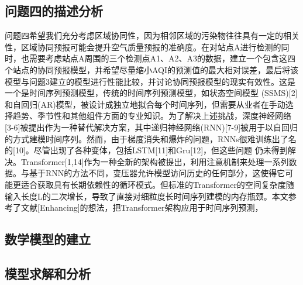 \documentclass[a4paper,10pt]{my_paper}
\numberwithin{equation}{section}
\begin{document}
\subsection{问题四的描述分析}
问题四希望我们充分考虑区域协同性，因为相邻区域的污染物往往具有一定的相关性，区域协同预报可能会提升空气质量预报的准确度。在对站点A进行检测的同时，也需要考虑站点A周围的三个检测点A1、A2、A3的数据，建立一个包含这四个站点的协同预报模型，并希望尽量缩小AQI的预测值的最大相对误差，最后将该模型与问题3建立的模型进行性能比较，并讨论协同预报模型的现实有效性。这是一个是时间序列预测模型，传统的时间序列预测模型，如状态空间模型 (SSMS)[2]和自回归(AR)模型，被设计成独立地拟合每个时间序列，但需要从业者在手动选择趋势、季节性和其他组件方面的专业知识。为了解决上述挑战，深度神经网络[3-6]被提出作为一种替代解决方案，其中递归神经网络(RNN)[7-9]被用于以自回归的方式建模时间序列。然而，由于梯度消失和爆炸的问题，RNNs很难训练出了名的[10]。尽管出现了各种变体，包括LSTM[11]和Gru[12]，但这些问题 仍未得到解决。Transformer[1,14]作为一种全新的架构被提出，利用注意机制来处理一系列数据。与基于RNN的方法不同，变压器允许模型访问历史的任何部分，这使得它可能更适合获取具有长期依赖性的循环模式。但标准的Transformer的空间复杂度随输入长度L的二次增长，导致了直接对细粒度长时间序列建模的内存瓶颈。本文参考了文献{\color{red}[Enhancing]}的想法，把Transformer架构应用于时间序列预测，
\subsection{数学模型的建立}

\subsection{模型求解和分析}
\end{document}
